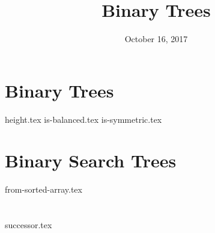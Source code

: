 \documentclass[11pt]{exam}
\title{Binary Trees}
\date{October 16, 2017}
\begin{document}
\maketitle

\section{Binary Trees}
\begin{questions}
{height.tex}
{is-balanced.tex}
\clearpage
{}\vspace*{-2em}
{is-symmetric.tex}
\end{questions}

\clearpage

\section{Binary Search Trees}
\begin{questions}
{from-sorted-array.tex}
\end{questions}

\clearpage

\section{}
\begin{questions}
{successor.tex}
\end{questions}
\end{document}
